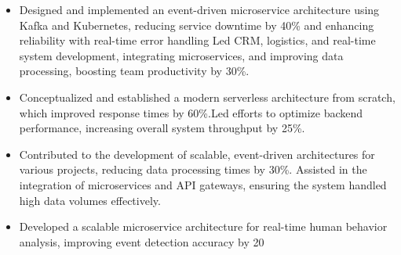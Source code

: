 \documentclass[10pt,a4paper,ragged2e]{classes/altacv}
\begin{document}

\begin{fullwidth}
\makecvheader
\end{fullwidth}





\begin{itemize}
    \item Designed and implemented an event-driven microservice architecture using Kafka and Kubernetes, reducing service downtime by 40\% and enhancing reliability with real-time error handling Led CRM, logistics, and real-time system development, integrating microservices, and improving data processing, boosting team productivity by 30\%.
\end{itemize}

\begin{itemize}
    \item Conceptualized and established a modern serverless architecture from scratch, which improved response times by 60\%.Led efforts to optimize backend performance, increasing overall system throughput by 25\%.
\end{itemize}

\begin{itemize}
\item Contributed to the development of scalable, event-driven architectures for various projects, reducing data processing times by 30\%. Assisted in the integration of microservices and API gateways, ensuring the system handled high data volumes effectively.
\end{itemize}

\divider

\begin{itemize}
\item Developed a scalable microservice architecture for real-time human behavior analysis, improving event detection accuracy by 20%
\end{itemize}
\end{document}
